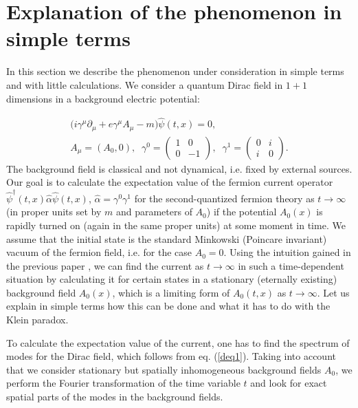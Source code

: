 \documentclass[12pt]{article}
\newcommand\beq{\begin{equation}}
\newcommand\eeq{\end{equation}}
\begin{document}
\section{Explanation of the phenomenon in simple terms}

In this section we describe the phenomenon under consideration in simple terms and with little calculations. 
We consider a quantum Dirac field in $1+1$ dimensions in a background electric potential:

\begin{eqnarray}
\label{deq1}
    \Big(i\gamma^{\mu}\partial_{\mu} + e \gamma^\mu A_\mu -m\Big)\hat{\psi}(t,x)=0, \\ A_\mu = (A_0, 0), \;\;
    \gamma^{0} = \begin{pmatrix}
	1 & 0\\
	0 & -1
	\end{pmatrix}, \;\; \gamma^{1} = \begin{pmatrix}
	0 & i\\
	i & 0
	\end{pmatrix}.    \nonumber 
\end{eqnarray}
The background field is classical and not dynamical, i.e. fixed by external sources. Our goal is to calculate the expectation value of the fermion current operator $\hat{\psi}^{\dagger}(t,x)\hat{\alpha}\hat{\psi}(t,x)$, $\hat{\alpha} = \gamma^0 \gamma^1$ 
for the second-quantized fermion theory as $t \to \infty$ (in proper units set by $m$ and parameters of $A_0$) if the potential $A_0(x)$ is rapidly turned on (again in the same proper units) at some moment in time. We assume that the initial state is the standard Minkowski (Poincare invariant) vacuum of the fermion field, i.e. for the case $A_0 = 0$. Using the intuition gained in the previous paper \cite{Akhmedov:2025jtk}, we can find the current as $t\to \infty$ in such a time-dependent situation by calculating it for certain states in a stationary (eternally existing) background field $A_0(x)$, which is a limiting form of $A_0(t,x)$ as $t\to \infty$. Let us explain in simple terms how this can be done and what it has to do with the Klein paradox. 

To calculate the expectation value of the current, one has to find the spectrum of modes for the Dirac field, which follows from eq. (\ref{deq1}). Taking into account that we consider stationary but spatially inhomogeneous background fields $A_0$, we perform the Fourier transformation of the time variable $t$ and look for exact spatial parts of the modes in the background fields. 
\end{document}
